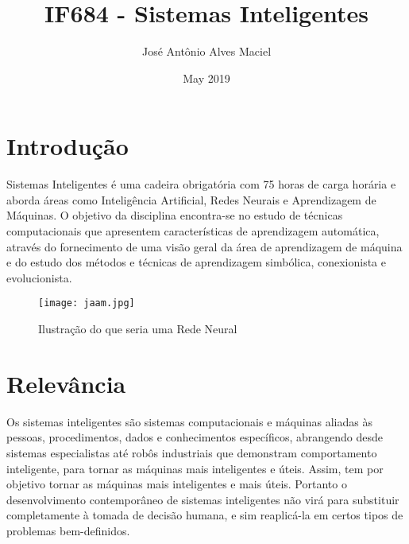 \documentclass[10pt]{article}
\title{IF684 - Sistemas Inteligentes}
\author{José Antônio Alves Maciel}
\date{May 2019}
\begin{document}
\maketitle

\section{Introdução}
Sistemas Inteligentes é uma cadeira obrigatória com 75 horas de carga horária e aborda áreas como Inteligência Artificial, Redes Neurais e Aprendizagem de Máquinas. O objetivo da disciplina encontra-se no estudo de técnicas computacionais que apresentem características de aprendizagem automática, através do fornecimento de uma visão geral da área de aprendizagem de máquina e do estudo dos métodos e técnicas de aprendizagem simbólica, conexionista e evolucionista.
\cite{intro}


\begin{figure}[h!]
\centering
\texttt{[image: jaam.jpg]}
\caption{Ilustração do que seria uma Rede Neural}\cite{imagem}
\label{fig:jaam}
\end{figure}

\section{Relevância}
Os sistemas inteligentes são sistemas computacionais e máquinas aliadas às pessoas, procedimentos, dados e conhecimentos específicos, abrangendo desde sistemas especialistas até robôs industriais que demonstram comportamento inteligente, para tornar as máquinas mais inteligentes e úteis. Assim, tem por objetivo tornar as máquinas mais inteligentes e mais úteis. Portanto o desenvolvimento contemporâneo de sistemas inteligentes não virá para substituir completamente à tomada de decisão humana, e sim reaplicá-la em certos tipos de problemas bem-definidos.
\end{document}
